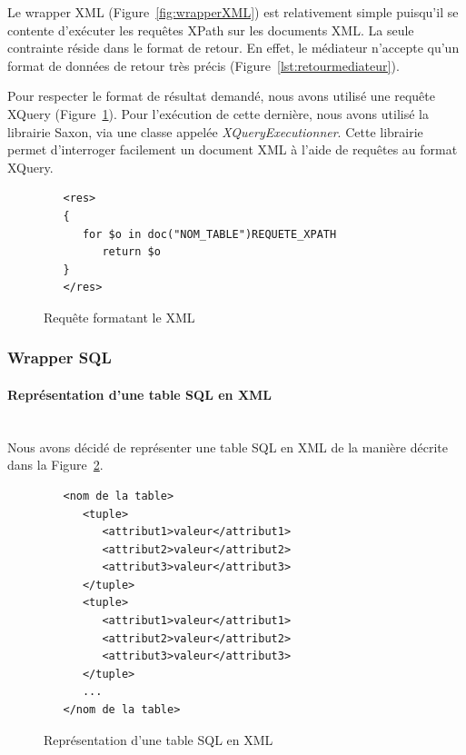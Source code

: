 \documentclass[a4paper,10pt]{article}
\newcommand{\fref}[1]{Figure~\ref{#1}}
\begin{document}
Le wrapper XML (\fref{fig:wrapperXML}) est relativement simple puisqu'il se contente d'exécuter les requêtes XPath sur les documents XML. La seule contrainte réside dans le format de retour. En effet, le médiateur n'accepte qu'un format de données de retour très précis (\fref{lst:retourmediateur}).

Pour respecter le format de résultat demandé, nous avons utilisé une requête XQuery (\fref{lst:format}). Pour l'exécution de cette dernière, nous avons utilisé la librairie Saxon, via une classe appelée \textit{XQueryExecutionner}. Cette librairie permet d'interroger facilement un document XML à l'aide de requêtes au format XQuery. 

\begin{figure}[ht!]
\begin{verbatim}
   <res>
   {
      for $o in doc("NOM_TABLE")REQUETE_XPATH
         return $o
   }
   </res>
\end{verbatim}
\caption{Requête formatant le XML}
\label{lst:format}
\end{figure}

\FloatBarrier




\subsubsection{Wrapper SQL} 

\paragraph{Représentation d'une table SQL en XML}~~\\

Nous avons décidé de représenter une table SQL en XML de la manière décrite dans la \fref{lst:sqlenxml}.

\begin{figure}[ht!]
\begin{verbatim}
   <nom de la table>
      <tuple>
         <attribut1>valeur</attribut1>
         <attribut2>valeur</attribut2>
         <attribut3>valeur</attribut3>
      </tuple>
      <tuple>
         <attribut1>valeur</attribut1>
         <attribut2>valeur</attribut2>
         <attribut3>valeur</attribut3>
      </tuple>
      ...
   </nom de la table>
\end{verbatim}
\caption{Représentation d'une table SQL en XML}
\label{lst:sqlenxml}
\end{figure}
\end{document}
